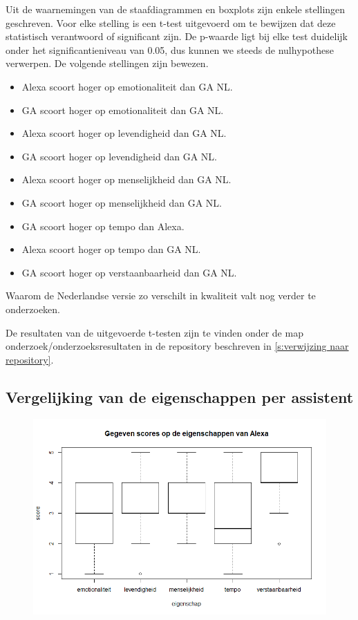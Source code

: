 Uit de waarnemingen van de staafdiagrammen en boxplots zijn enkele stellingen geschreven. Voor elke stelling is een t-test uitgevoerd om te bewijzen dat deze statistisch verantwoord of significant zijn. De p-waarde ligt bij elke test duidelijk onder het significantieniveau van 0.05, dus kunnen we steeds de nulhypothese verwerpen. De volgende stellingen zijn bewezen.
\begin{itemize}
    \item Alexa scoort hoger op emotionaliteit dan \gls{GA NL}.
    \item \gls{GA} scoort hoger op emotionaliteit dan \gls{GA NL}.
    \item Alexa scoort hoger op levendigheid dan \gls{GA NL}.
    \item \gls{GA} scoort hoger op levendigheid dan \gls{GA NL}.
    \item Alexa scoort hoger op menselijkheid dan \gls{GA NL}.
    \item \gls{GA} scoort hoger op menselijkheid dan \gls{GA NL}.
    \item \gls{GA} scoort hoger op tempo dan Alexa.
    \item Alexa scoort hoger op tempo dan \gls{GA NL}.
    \item \gls{GA} scoort hoger op verstaanbaarheid dan \gls{GA NL}.
\end{itemize}
Waarom de Nederlandse versie zo verschilt in kwaliteit valt nog verder te onderzoeken.

De resultaten van de uitgevoerde t-testen zijn te vinden onder de map onderzoek/onderzoeksresultaten in de repository beschreven in \ref{s:verwijzing naar repository}.

\subsection{Vergelijking van de eigenschappen per assistent}
\begin{figure}[h]
    \includegraphics[width=0.9\linewidth]{../onderzoek/onderzoeksresultaten/vergelijking_eigenschappen_per_assistent/boxplot_score_eigenschappen_alexa}
    \caption{}
    \label{fig:boxplot-alexa}
\end{figure}

